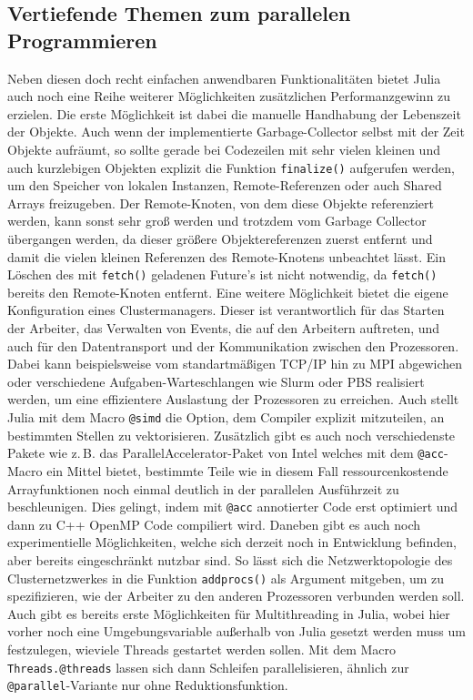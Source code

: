 \documentclass[proseminar,german,utf8]{zihpub}
\newcommand{\zB}[0]{{z.\,B. }}
\begin{document}
\subsection{Vertiefende Themen zum parallelen Programmieren}

Neben diesen doch recht einfachen anwendbaren Funktionalitäten bietet Julia auch noch eine Reihe weiterer Möglichkeiten zusätzlichen Performanzgewinn zu erzielen. Die erste Möglichkeit ist dabei die manuelle Handhabung der Lebenszeit der Objekte. Auch wenn der implementierte Garbage-Collector selbst mit der Zeit Objekte aufräumt, so sollte gerade bei Codezeilen mit sehr vielen kleinen und auch kurzlebigen Objekten explizit die Funktion \verb|finalize()| aufgerufen werden, um den Speicher von lokalen Instanzen, Remote-Referenzen oder auch Shared Arrays freizugeben. Der Remote-Knoten, von dem diese Objekte referenziert werden, kann sonst sehr groß werden und trotzdem vom Garbage Collector übergangen werden, da dieser größere Objektereferenzen zuerst entfernt und damit die vielen kleinen Referenzen des Remote-Knotens unbeachtet lässt. Ein Löschen des mit \verb|fetch()| geladenen Future's ist nicht notwendig, da \verb|fetch()| bereits den Remote-Knoten entfernt. Eine weitere Möglichkeit bietet die eigene Konfiguration eines Clustermanagers. Dieser ist verantwortlich für das Starten der Arbeiter, das Verwalten von Events, die auf den Arbeitern auftreten, und auch für den Datentransport und der Kommunikation zwischen den Prozessoren. Dabei kann beispielsweise vom standartmäßigen TCP/IP hin zu MPI abgewichen oder verschiedene Aufgaben-Warteschlangen wie Slurm oder PBS realisiert werden, um eine effizientere Auslastung der Prozessoren zu erreichen. Auch stellt Julia mit dem Macro \verb|@simd| die Option, dem Compiler explizit mitzuteilen, an bestimmten Stellen zu vektorisieren. Zusätzlich gibt es auch noch verschiedenste Pakete wie \zB das ParallelAccelerator-Paket von Intel welches mit dem \verb|@acc|-Macro ein Mittel bietet, bestimmte Teile wie in diesem Fall ressourcenkostende Arrayfunktionen noch einmal deutlich in der parallelen Ausführzeit zu beschleunigen. Dies gelingt, indem mit  \verb|@acc| annotierter Code erst optimiert und dann zu C++ OpenMP Code compiliert wird. Daneben gibt es auch noch experimentielle Möglichkeiten, welche sich derzeit noch in Entwicklung befinden, aber bereits eingeschränkt nutzbar sind. So lässt sich die Netzwerktopologie des Clusternetzwerkes in die Funktion \verb|addprocs()| als Argument mitgeben, um zu spezifizieren, wie der Arbeiter zu den anderen Prozessoren verbunden werden soll. Auch gibt es bereits erste Möglichkeiten für Multithreading in Julia, wobei hier vorher noch eine Umgebungsvariable außerhalb von Julia gesetzt werden muss um festzulegen, wieviele Threads gestartet werden sollen. Mit dem Macro \verb|Threads.@threads| lassen sich dann Schleifen parallelisieren, ähnlich zur \verb|@parallel|-Variante nur ohne Reduktionsfunktion.~\cite{JuliaLangDocumentation}~\cite{JuliaLangParallelAccelerator}
\end{document}
